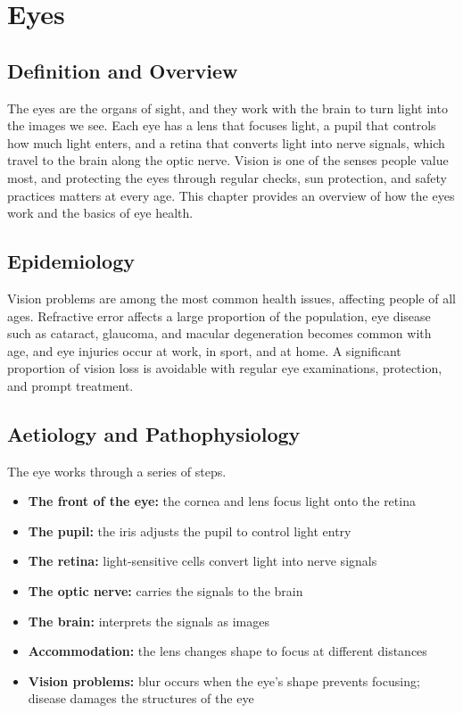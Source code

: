 \chapter{Eyes}

\section*{Definition and Overview}
The eyes are the organs of sight, and they work with the brain to turn light into the images we see. Each eye has a lens that focuses light, a pupil that controls how much light enters, and a retina that converts light into nerve signals, which travel to the brain along the optic nerve. Vision is one of the senses people value most, and protecting the eyes through regular checks, sun protection, and safety practices matters at every age. This chapter provides an overview of how the eyes work and the basics of eye health.

\section*{Epidemiology}
Vision problems are among the most common health issues, affecting people of all ages. Refractive error affects a large proportion of the population, eye disease such as cataract, glaucoma, and macular degeneration becomes common with age, and eye injuries occur at work, in sport, and at home. A significant proportion of vision loss is avoidable with regular eye examinations, protection, and prompt treatment.

\section*{Aetiology and Pathophysiology}
The eye works through a series of steps.
\begin{itemize}
    \item \textbf{The front of the eye:} the cornea and lens focus light onto the retina
    \item \textbf{The pupil:} the iris adjusts the pupil to control light entry
    \item \textbf{The retina:} light-sensitive cells convert light into nerve signals
    \item \textbf{The optic nerve:} carries the signals to the brain
    \item \textbf{The brain:} interprets the signals as images
    \item \textbf{Accommodation:} the lens changes shape to focus at different distances
    \item \textbf{Vision problems:} blur occurs when the eye's shape prevents focusing; disease damages the structures of the eye
\end{itemize}

